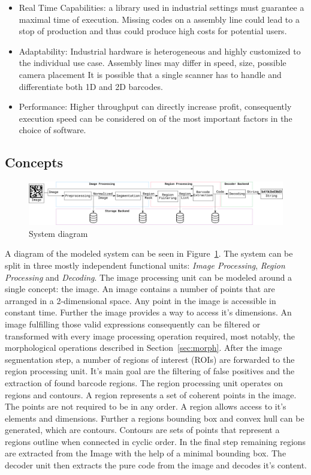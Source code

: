 \documentclass[runningheads,a4paper]{llncs}
\begin{document}
\begin{itemize}
  \item{Real Time Capabilities:} a library used in industrial settings must
    guarantee a maximal time of execution. Missing codes on a assembly line
    could lead to a stop of production and thus could produce
    high costs for potential users.
  \item{Adaptability:} Industrial hardware is heterogeneous and highly
    customized to the individual use case. Assembly lines may
    differ in speed, size, possible camera placement
    It is possible that a single scanner has to handle and differentiate
    both 1D and 2D barcodes.
  \item{Performance:} Higher throughput can directly increase profit,
    consequently execution speed can be considered on of the most important
    factors in the choice of software.
\end{itemize}

\subsection{Concepts}
\label{sec:concepts}

\begin{figure}[t]
  \includegraphics[width=\textwidth]{images/systemdiagram}
  \caption{System diagram}
  \label{fig:systemdiagram}
\end{figure}

A diagram of the modeled system can be seen in Figure~\ref{fig:systemdiagram}.
The system can be split in three mostly independent functional units:
\emph{Image Processing}, \emph{Region Processing} and \emph{Decoding}.
The image processing unit can be modeled around a single concept: the image. 
An image contains a number of points that are arranged in a 2-dimensional space.
Any point in the image is accessible in constant time. Further the image
provides a way to access it's dimensions. An image fulfilling those valid
expressions consequently can be filtered or transformed with every
image processing operation required, most notably, the morphological
operations described in Section~\ref{sec:morph}. After the image segmentation
step, a number of regions of interest (ROIs) are forwarded to the region
processing unit. It's main goal are the filtering of false positives and the
extraction of found barcode regions. The region processing unit operates on
regions and contours. A region represents a set of coherent points in the image. The points
are not required to be in any order. A region allows access to it's
elements and dimensions. Further a regions bounding box and convex hull can be
generated, which are contours. Contours are sets of points that represent a
regions outline when connected in cyclic order. In the final step remaining regions
are extracted from the Image with the help of a minimal bounding box. The decoder unit
then extracts the pure code from the image and decodes it's content.
\end{document}
